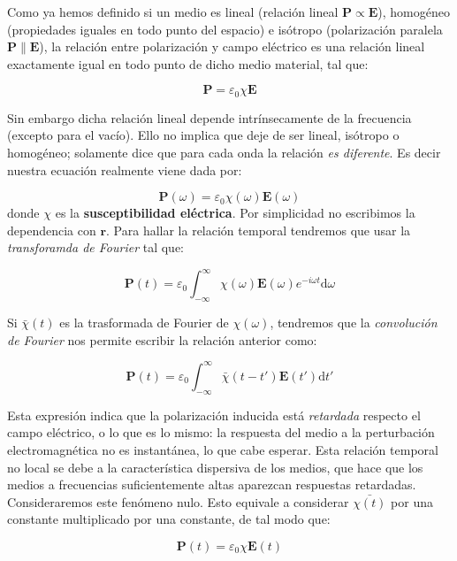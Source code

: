 \documentclass[12pt]{article}
\newcommand{\D}{\mathrm{d}}
\newcommand{\En}{\mathbf{E}}
\newcommand{\rn}{\mathbf{r}}
\newcommand{\Pn}{\mathbf{P}}
\numberwithin{equation}{section}
\numberwithin{figure}{section}
\begin{document}
Como ya hemos definido si un medio es lineal (relación lineal $\Pn \propto \En$), homogéneo (propiedades iguales en todo punto del espacio) e isótropo (polarización paralela  $\Pn \parallel \En$), la relación entre polarización y campo eléctrico es una relación lineal exactamente igual en todo punto de dicho medio material, tal que:

\begin{equation}
\Pn =  \varepsilon_0 \chi \En
\end{equation}

Sin embargo dicha relación lineal depende intrínsecamente de la frecuencia (excepto para el vacío). Ello no implica que deje de ser lineal, isótropo o homogéneo; solamente dice que para cada onda la relación \textit{es diferente}. Es decir nuestra ecuación realmente viene dada por:

\begin{equation}
\Pn (\omega) = \varepsilon_0 \chi (\omega) \En (\omega)
\end{equation}
donde $\chi$ es la \textbf{susceptibilidad eléctrica}. Por simplicidad no escribimos la dependencia con $\rn$. Para hallar la relación temporal tendremos que usar la \textit{transforamda de Fourier} tal que:

\begin{equation}
\Pn (t) = \varepsilon_0 \int_{-\infty}^\infty \chi (\omega) \En (\omega) e^{-i \omega t} \D \omega
\end{equation}

Si $\bar{\chi} (t)$ es la trasformada de Fourier de $\chi (\omega)$, tendremos que la \textit{convolución de Fourier} nos permite escribir la relación anterior como:

\begin{equation}
\Pn (t) = \varepsilon_0 \int_{-\infty}^{\infty} \bar{\chi} (t-t') \En (t') \D t'
\end{equation}

Esta expresión indica que la polarización inducida está \textit{retardada} respecto el campo eléctrico, o lo que es lo mismo: la respuesta del medio a la perturbación electromagnética no es instantánea, lo que cabe esperar. Esta relación temporal no local se debe a la característica dispersiva de los medios, que hace que los medios a frecuencias suficientemente altas aparezcan respuestas retardadas. Consideraremos este fenómeno nulo. Esto equivale a considerar $\bar{\chi(t)}$ por una constante multiplicado por una constante, de tal modo que:


\begin{equation}
\Pn (t) =  \varepsilon_0 \chi \En (t)
\end{equation}
\end{document}
